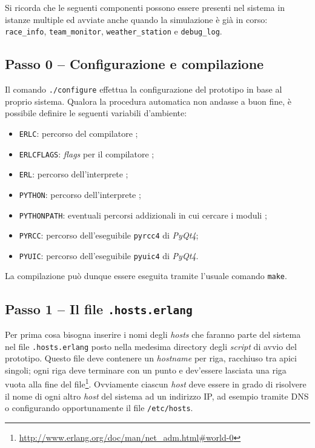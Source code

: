 Si ricorda che le seguenti componenti possono essere presenti nel sistema in istanze multiple ed avviate anche quando la simulazione è già in corso: \texttt{race\_info}, \texttt{team\_monitor}, \texttt{weather\_station} e \texttt{debug\_log}.

\subsection*{Passo 0 -- Configurazione e compilazione}
Il comando \texttt{./configure} effettua la configurazione del prototipo in base al proprio sistema. Qualora la procedura automatica non andasse a buon fine, è possibile definire le seguenti variabili d'ambiente:
\begin{itemize}
\item \texttt{ERLC}: percorso del compilatore \Erlang{};
\item \texttt{ERLCFLAGS}: \textsl{flags} per il compilatore \Erlang{};
\item \texttt{ERL}: percorso dell'interprete \Erlang{};
\item \texttt{PYTHON}: percorso dell'interprete \Python{};
\item \texttt{PYTHONPATH}: eventuali percorsi addizionali in cui cercare i moduli \Python{};
\item \texttt{PYRCC}: percorso dell'eseguibile \texttt{pyrcc4} di \textsl{PyQt4};
\item \texttt{PYUIC}: percorso dell'eseguibile \texttt{pyuic4} di \textsl{PyQt4}.
\end{itemize}
La compilazione può dunque essere eseguita tramite l'usuale comando \texttt{make}.

\subsection*{Passo 1 -- Il file \texttt{.hosts.erlang}}
Per prima cosa bisogna inserire i nomi degli \textit{hosts} che faranno parte del sistema nel file \texttt{.hosts.erlang} posto nella medesima directory degli \textit{script} di avvio del prototipo. Questo file deve contenere un \textit{hostname} per riga, racchiuso tra apici singoli; ogni riga deve terminare con un punto e dev'essere lasciata una riga vuota alla fine del file\footnote{\url{http://www.erlang.org/doc/man/net_adm.html\#world-0}}.
Ovviamente ciascun \textit{host} deve essere in grado di risolvere il nome di ogni altro \textit{host} del sistema ad un indirizzo IP, ad esempio tramite DNS o configurando opportunamente il file \texttt{/etc/hosts}.

